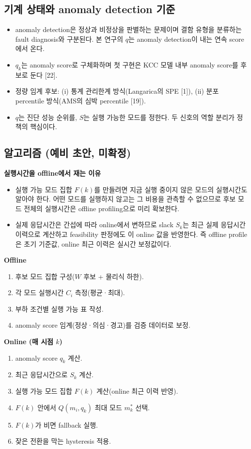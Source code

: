 \documentclass[10pt]{article}
\begin{document}
\subsection{기계 상태와 anomaly detection 기준}
\begin{itemize}
\item anomaly detection은 정상과 비정상을 판별하는 문제이며 결함 유형을 분류하는 fault diagnosis와 구분된다. 본 연구의 $q$는 anomaly detection이 내는 연속 score에서 온다.
\item $q_k$는 anomaly score로 구체화하며 첫 구현은 KCC 모델 내부 anomaly score를 후보로 둔다 [22].
\item 정량 임계 후보: (i) 통계 관리한계 방식(Langarica의 SPE [1]), (ii) 분포 percentile 방식(AMS의 심박 percentile [19]).
\item $q$는 진단 성능 순위를, $S$는 실행 가능한 모드를 정한다. 두 신호의 역할 분리가 정책의 핵심이다.
\end{itemize}

\subsection{알고리즘 (예비 초안, 미확정)}
\noindent\textbf{실행시간을 offline에서 재는 이유}
\begin{itemize}
\item 실행 가능 모드 집합 $F(k)$를 만들려면 지금 실행 중이지 않은 모드의 실행시간도 알아야 한다. 어떤 모드를 실행하지 않고는 그 비용을 관측할 수 없으므로 후보 모드 전체의 실행시간은 offline profiling으로 미리 확보한다.
\item 실제 응답시간은 간섭에 따라 online에서 변하므로 slack $S_k$는 최근 실제 응답시간 이력으로 계산하고 feasibility 판정에도 이 online 값을 반영한다. 즉 offline profile은 초기 기준값, online 최근 이력은 실시간 보정값이다.
\end{itemize}
\noindent\textbf{Offline}
\begin{enumerate}
\item 후보 모드 집합 구성($W$ 후보 + 물리식 하한).
\item 각 모드 실행시간 $C_i$ 측정(평균·최대).
\item 부하 조건별 실행 가능 표 작성.
\item anomaly score 임계(정상·의심·경고)를 검증 데이터로 보정.
\end{enumerate}
\noindent\textbf{Online (매 시점 $k$)}
\begin{enumerate}
\item anomaly score $q_k$ 계산.
\item 최근 응답시간으로 $S_k$ 계산.
\item 실행 가능 모드 집합 $F(k)$ 계산(online 최근 이력 반영).
\item $F(k)$ 안에서 $Q(m_i,q_k)$ 최대 모드 $m^{*}_k$ 선택.
\item $F(k)$가 비면 fallback 실행.
\item 잦은 전환을 막는 hysteresis 적용.
\end{enumerate}
\end{document}
